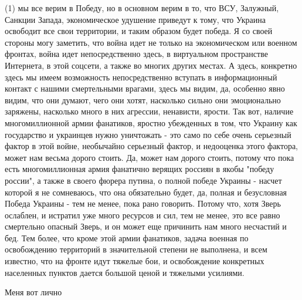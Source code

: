 (1) мы все верим в Победу, но в основном верим в то, что ВСУ, Залужный, Санкции
Запада, экономическое удушение приведут к тому, что Украина освободит все свои
территории, и таким образом будет победа. Я со своей стороны могу заметить, что
война идет не только на экономическом или военном фронтах, война идет
непосредственно здесь, в виртуальном пространстве Интернета, в этой соцсети, а
также во многих других местах. А здесь, конкретно здесь мы имеем возможность
непосредственно вступать в информационный контакт с нашими смертельными
врагами, здесь мы видим, да, особенно явно видим, что они думают, чего они
хотят, насколько сильно они эмоционально заряжены, насколько много в них
агрессии, ненависти, ярости. Так вот, наличие многомиллионной армии фанатиков,
яростно убежденных в том, что Украину как государство и украинцев нужно
уничтожать - это само по себе очень серьезный фактор в этой войне, необычайно
серьезный фактор, и недооценка этого фактора, может нам весьма дорого стоить.
Да, может нам дорого стоить, потому что пока есть многомиллионная армия
фанатично верящих россиян в якобы "победу россии", а также в своего фюрера
путина, о полной победе Украины - насчет которой я не сомневаюсь, что она
обязательно будет, да, полная и безусловная Победа Украины - тем не менее, пока
рано говорить. Потому что, хотя Зверь ослаблен, и истратил уже много ресурсов и
сил, тем не менее, это все равно смертельно опасный Зверь, и он может еще
причинить нам много несчастий и бед.  Тем более, что кроме этой армии
фанатиков, задача военная по освобождению территорий в значительной степени не
выполнена, и всем известно, что на фронте идут тяжелые бои, и освобождение
конкретных населенных пунктов дается большой ценой и тяжелыми усилиями. 

Меня вот лично 





